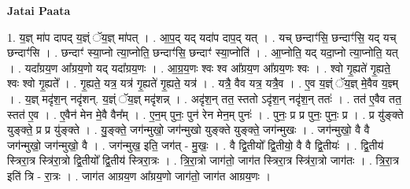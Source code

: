 \documentclass[17pt]{extarticle}
\begin{document}
\textbf{Jatai Paata} \newline

1. य॒ज्ञ् मा॑प दापद् य॒ज्ञ्ं ॅय॒ज्ञ् मा॑पत् । . आ॒प॒द् यद् यदा॑प दाप॒द् यत् । . यच् छन्दाꣳ॑सि॒ छन्दाꣳ॑सि॒ यद् यच् छन्दाꣳ॑सि । . छन्दाꣳ॑ स्या॒प्नो त्या॒प्नोति॒ छन्दाꣳ॑सि॒ छन्दाꣳ॑ स्या॒प्नोति॑ । . आ॒प्नोति॒ यद् यदा॒प्नो त्या॒प्नोति॒ यत् । . यदा᳚ग्रय॒ण आ᳚ग्रय॒णो यद् यदा᳚ग्रय॒णः । . आ॒ग्र॒य॒णः श्वः श्व आ᳚ग्रय॒ण आ᳚ग्रय॒णः श्वः । . श्वो गृ॒ह्यते॑ गृ॒ह्यते॒ श्वः श्वो गृ॒ह्यते᳚ । . गृ॒ह्यते॒ यत्र॒ यत्र॑ गृ॒ह्यते॑ गृ॒ह्यते॒ यत्र॑ । . यत्रै॒ वैव यत्र॒ यत्रै॒व । . ए॒व य॒ज्ञ्ं ॅय॒ज्ञ् मे॒वैव य॒ज्ञ्म् । . य॒ज्ञ् मदृ॑श॒न् नदृ॑शन्. य॒ज्ञ्ं ॅय॒ज्ञ् मदृ॑शन्न् । . अदृ॑श॒न् तत॒ स्ततो ऽदृ॑श॒न् नदृ॑श॒न् ततः॑ । . तत॑ ए॒वैव तत॒ स्तत॑ ए॒व । . ए॒वैन॑ मेन मे॒वै वैन᳚म् । . ए॒न॒म् पुनः॒ पुन॑ रेन मेन॒म् पुनः॑ । . पुनः॒ प्र प्र पुनः॒ पुनः॒ प्र । . प्र यु॑ङ्क्ते युङ्क्ते॒ प्र प्र यु॑ङ्क्ते । . यु॒ङ्क्ते॒ जग॑न्मुखो॒ जग॑न्मुखो युङ्क्ते युङ्क्ते॒ जग॑न्मुखः । . जग॑न्मुखो॒ वै वै जग॑न्मुखो॒ जग॑न्मुखो॒ वै । . जग॑न्मुख॒ इति॒ जग॑त् - मु॒खः॒ । . वै द्वि॒तीयो᳚ द्वि॒तीयो॒ वै वै द्वि॒तीयः॑ । . द्वि॒तीय॑ स्त्रिरा॒त्र स्त्रि॑रा॒त्रो द्वि॒तीयो᳚ द्वि॒तीय॑ स्त्रिरा॒त्रः । . त्रि॒रा॒त्रो जाग॑तो॒ जाग॑त स्त्रिरा॒त्र स्त्रि॑रा॒त्रो जाग॑तः । . त्रि॒रा॒त्र इति॑ त्रि - रा॒त्रः । . जाग॑त आग्रय॒ण आ᳚ग्रय॒णो जाग॑तो॒ जाग॑त आग्रय॒णः । \newline
\end{document}
